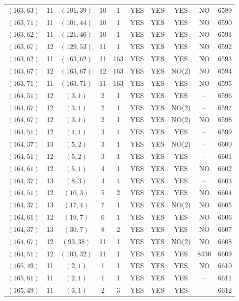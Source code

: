 \begin{longtable}{|c|c|c|c|c|c|c|c|c|c|}
$(163, 63)$ & 11 & $(101, 39)$ & 10 & 1 & YES & YES & YES & NO & 6589\\
$(163, 71)$ & 11 & $(101, 44)$ & 10 & 1 & YES & YES & YES & NO & 6590\\
$(163, 62)$ & 11 & $(121, 46)$ & 10 & 1 & YES & YES & YES & NO & 6591\\
$(163, 67)$ & 12 & $(129, 53)$ & 11 & 1 & YES & YES & YES & NO & 6592\\
$(163, 62)$ & 11 & $(163, 62)$ & 11 & 163 & YES & YES & YES & NO & 6593\\
$(163, 67)$ & 12 & $(163, 67)$ & 12 & 163 & YES & YES & NO(2) & NO & 6594\\
$(163, 71)$ & 11 & $(163, 71)$ & 11 & 163 & YES & YES & YES & NO & 6595\\
$(164, 51)$ & 12 & $(3, 1)$ & 2 & 1 & YES & YES & YES & -- & 6596\\
$(164, 67)$ & 12 & $(3, 1)$ & 2 & 1 & YES & YES & NO(2) & -- & 6597\\
$(164, 67)$ & 12 & $(3, 1)$ & 2 & 1 & YES & YES & NO(2) & NO & 6598\\
$(164, 51)$ & 12 & $(4, 1)$ & 3 & 4 & YES & YES & YES & -- & 6599\\
$(164, 37)$ & 13 & $(5, 2)$ & 3 & 1 & YES & YES & NO(2) & -- & 6600\\
$(164, 51)$ & 12 & $(5, 2)$ & 3 & 1 & YES & YES & YES & -- & 6601\\
$(164, 61)$ & 12 & $(5, 1)$ & 4 & 1 & YES & YES & YES & NO & 6602\\
$(164, 37)$ & 13 & $(8, 3)$ & 4 & 4 & YES & YES & YES & -- & 6603\\
$(164, 51)$ & 12 & $(10, 3)$ & 5 & 2 & YES & YES & YES & NO & 6604\\
$(164, 37)$ & 13 & $(17, 4)$ & 7 & 1 & YES & YES & NO(2) & NO & 6605\\
$(164, 61)$ & 12 & $(19, 7)$ & 6 & 1 & YES & YES & YES & NO & 6606\\
$(164, 37)$ & 13 & $(30, 7)$ & 8 & 2 & YES & YES & YES & NO & 6607\\
$(164, 67)$ & 12 & $(93, 38)$ & 11 & 1 & YES & YES & NO(2) & NO & 6608\\
$(164, 51)$ & 12 & $(103, 32)$ & 11 & 1 & YES & YES & YES & 8430 & 6609\\
$(165, 49)$ & 11 & $(2, 1)$ & 1 & 1 & YES & YES & YES & NO & 6610\\
$(165, 61)$ & 11 & $(2, 1)$ & 1 & 1 & YES & YES & YES & -- & 6611\\
$(165, 49)$ & 11 & $(3, 1)$ & 2 & 3 & YES & YES & YES & -- & 6612\\

\end{longtable}
